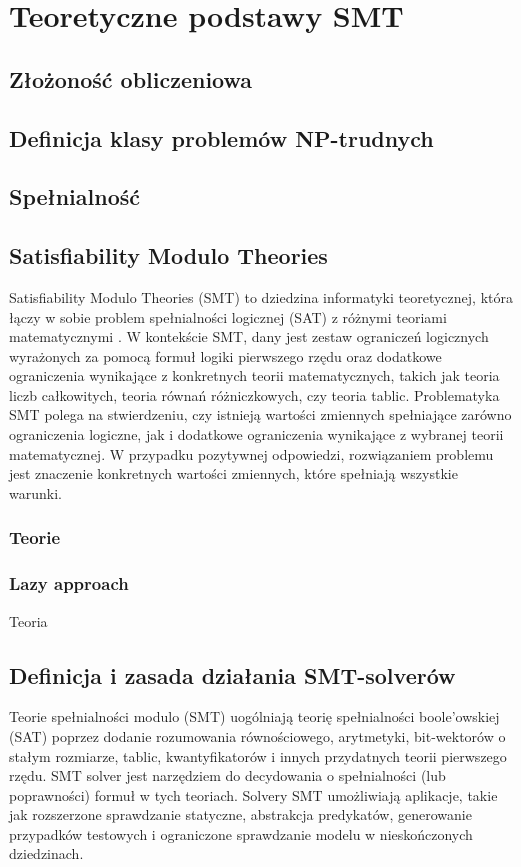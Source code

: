 \chapter{Teoretyczne podstawy SMT}
\section{Złożoność obliczeniowa}

\section{Definicja klasy problemów NP-trudnych}

\section{Spełnialność}


\section{Satisfiability Modulo Theories}
	Satisfiability Modulo Theories (SMT) to dziedzina informatyki teoretycznej, która łączy w sobie problem spełnialności logicznej (SAT) z różnymi teoriami matematycznymi \cite{MouraB11}. 
	W kontekście SMT, dany jest zestaw ograniczeń logicznych wyrażonych za pomocą formuł logiki pierwszego rzędu oraz dodatkowe ograniczenia wynikające z konkretnych teorii matematycznych, takich jak teoria liczb całkowitych, teoria równań różniczkowych, czy teoria tablic.
	Problematyka SMT polega na stwierdzeniu, czy istnieją wartości zmiennych spełniające zarówno ograniczenia logiczne, jak i dodatkowe ograniczenia wynikające z wybranej teorii matematycznej. W przypadku pozytywnej odpowiedzi, rozwiązaniem problemu jest znaczenie konkretnych wartości zmiennych, które spełniają wszystkie warunki.
	\subsection{Teorie}
	\subsection{Lazy approach}
	Teoria 
\section{Definicja i zasada działania SMT-solverów}
Teorie spełnialności modulo (SMT) uogólniają teorię spełnialności boole'owskiej (SAT) poprzez dodanie rozumowania równościowego, arytmetyki, bit-wektorów o stałym rozmiarze, tablic, kwantyfikatorów i innych przydatnych teorii pierwszego rzędu.
SMT solver jest narzędziem do decydowania o spełnialności (lub poprawności) formuł w tych teoriach. 
Solvery SMT umożliwiają aplikacje, takie jak rozszerzone sprawdzanie statyczne, abstrakcja predykatów, generowanie przypadków testowych i ograniczone sprawdzanie modelu w nieskończonych dziedzinach.



